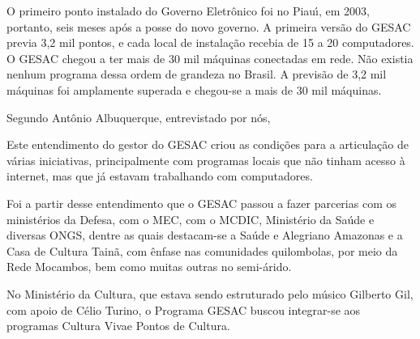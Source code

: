 \documentclass[
12pt,		%
openright,	%
twoside,  %
a4paper,			%
chapter=TITLE,		%
english,			%
french,				%
spanish,			%
brazil				%
]{USPSC-classe/USPSC}
\begin{document}
O primeiro ponto instalado do Governo Eletr\^onico foi no Piau\'{\i}, em 2003, portanto, seis meses ap\'os a posse do novo governo. A primeira vers\~ao do GESAC previa 3,2 mil pontos, e cada local de instala\c{c}\~ao recebia de 15 a 20 computadores. O GESAC chegou a ter mais de 30 mil m\'aquinas conectadas em rede. N\~ao existia nenhum programa dessa ordem de grandeza no Brasil. A previs\~ao de 3,2 mil m\'aquinas foi amplamente superada e chegou-se a mais de 30 mil m\'aquinas.




Segundo Ant\^onio Albuquerque, entrevistado por n\'os,





\noindent\begin{center}\mbox{\centering{}}\end{center}


Este entendimento do gestor do GESAC criou as condi\c{c}\~oes para a articula\c{c}\~ao de v\'arias iniciativas, principalmente com programas locais que n\~ao tinham acesso \`a internet, mas que j\'a estavam trabalhando com computadores.




Foi a partir desse entendimento que o GESAC passou a fazer parcerias com os minist\'erios da Defesa, com o MEC, com o MCDIC,  Minist\'erio da Sa\'ude e diversas ONGS, dentre as quais destacam-se a \textquotedbl Sa\'ude e Alegria\textquotedbl   no Amazonas e a \textquotedbl Casa de Cultura Tain\~a\textquotedbl , com \^enfase nas comunidades quilombolas, por meio da Rede Mocambos, bem como muitas outras no semi-\'arido.




No Minist\'erio da Cultura, que estava sendo estruturado pelo m\'usico Gilberto Gil, com apoio de C\'elio Turino, o Programa GESAC buscou integrar-se aos programas \textquotedbl Cultura Viva\textquotedbl  e \textquotedbl Pontos de Cultura\textquotedbl .
\end{document}
